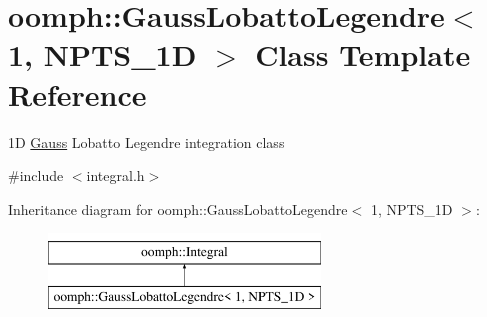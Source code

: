 \hypertarget{classoomph_1_1GaussLobattoLegendre_3_011_00_01NPTS__1D_01_4}{}\section{oomph\+:\+:Gauss\+Lobatto\+Legendre$<$ 1, N\+P\+T\+S\+\_\+1D $>$ Class Template Reference}
\label{classoomph_1_1GaussLobattoLegendre_3_011_00_01NPTS__1D_01_4}


1D \hyperlink{classoomph_1_1Gauss}{Gauss} Lobatto Legendre integration class  




{\ttfamily \#include $<$integral.\+h$>$}

Inheritance diagram for oomph\+:\+:Gauss\+Lobatto\+Legendre$<$ 1, N\+P\+T\+S\+\_\+1D $>$\+:\begin{figure}[H]
\begin{center}
\leavevmode
\includegraphics[height=2.000000cm]{classoomph_1_1GaussLobattoLegendre_3_011_00_01NPTS__1D_01_4}
\end{center}
\end{figure}
